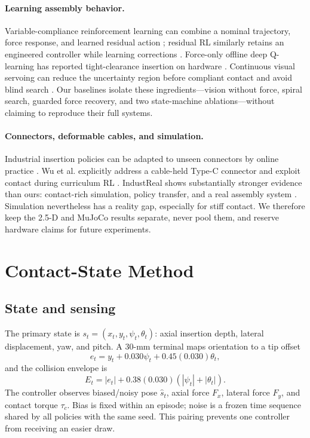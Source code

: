 \documentclass[journal]{IEEEtran}
\begin{document}
\paragraph{Learning assembly behavior.}
Variable-compliance reinforcement learning can combine a nominal trajectory,
force response, and learned residual action \cite{beltran2020variable}; residual
RL similarly retains an engineered controller while learning corrections
\cite{johannink2019residual}.  Force-only offline deep Q-learning has reported
tight-clearance insertion on hardware \cite{markert2023force}.  Continuous
visual servoing can reduce the uncertainty region before compliant contact and
avoid blind search \cite{haugaard2021visual}.  Our baselines isolate these
ingredients---vision without force, spiral search, guarded force recovery, and
two state-machine ablations---without claiming to reproduce their full systems.

\paragraph{Connectors, deformable cables, and simulation.}
Industrial insertion policies can be adapted to unseen connectors by online
practice \cite{nair2022learning}.  Wu et al. explicitly address a cable-held
Type-C connector and exploit contact during curriculum RL
\cite{wu2025dloassembly}.  IndustReal shows substantially stronger evidence than
ours: contact-rich simulation, policy transfer, and a real assembly system
\cite{tang2023industreal}.  Simulation nevertheless has a reality gap, especially
for stiff contact.  We therefore keep the 2.5-D and MuJoCo results separate,
never pool them, and reserve hardware claims for future experiments.

\section{Contact-State Method}

\subsection{State and sensing}

The primary state is $s_t=(x_t,y_t,\psi_t,\theta_t)$: axial insertion depth,
lateral displacement, yaw, and pitch.  A 30-mm terminal maps orientation to a
tip offset
\begin{equation}
  e_t=y_t+0.030\psi_t+0.45(0.030)\theta_t,
\end{equation}
and the collision envelope is
\begin{equation}
  E_t=|e_t|+0.38(0.030)(|\psi_t|+|\theta_t|).
  \label{eq:envelope}
\end{equation}
The controller observes biased/noisy pose $\hat{s}_t$, axial force $F_x$,
lateral force $F_y$, and contact torque $\tau_c$.  Bias is fixed within an
episode; noise is a frozen time sequence shared by all policies with the same
seed.  This pairing prevents one controller from receiving an easier draw.
\end{document}
